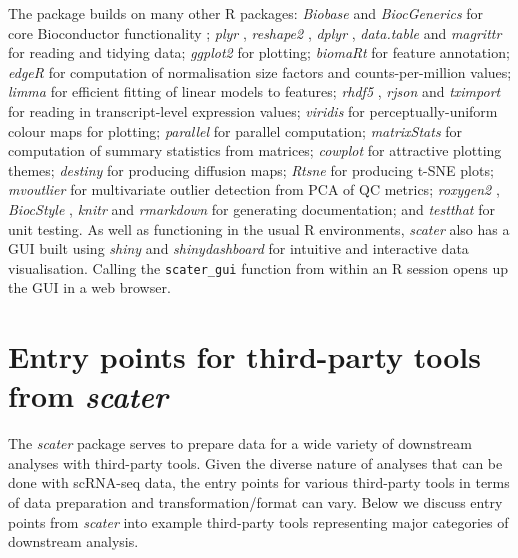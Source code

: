 \documentclass[10pt,letterpaper]{article}
\begin{document}
The package builds on many other R packages: \emph{Biobase} and \emph{BiocGenerics} for core Bioconductor functionality  \citep{Huber2015-en}; \emph{plyr} \citep{Wickham2015-kj}, \emph{reshape2} \citep{Wickham2012-ec}, \emph{dplyr} \citep{Wickham2015-la}, \emph{data.table} \citep{Dowle2015-zc} and \emph{magrittr} \citep{Bache2014-sa} for reading and
tidying data; \emph{ggplot2} \citep{Wickham2016-dc} for plotting; \emph{biomaRt} \citep{Durinck2005-yz} for feature annotation; \emph{edgeR} \citep{Robinson2010-ky} for computation of normalisation size factors and counts-per-million values; \emph{limma} \citep{Ritchie2015-so} for efficient fitting of linear models to features; \emph{rhdf5} \citep{Fischer2016-me}, \emph{rjson} \citep{Couture-Beil2014-kk} and \emph{tximport} \citep{Soneson2015-fw} for reading in transcript-level expression values;
\emph{viridis} \citep{Garnier2016-hk} for perceptually-uniform colour
maps for plotting; \emph{parallel} for parallel computation; \emph{matrixStats} \citep{Bengtsson2016-tn} for computation of summary statistics from matrices; \emph{cowplot} \citep{Wilke2016-hj} for attractive plotting themes; \emph{destiny} \citep{Angerer2015-sw} for producing diffusion maps; \emph{Rtsne} \citep{Krijthe2015-is} for producing t-SNE plots; \emph{mvoutlier}
\citep{Filzmoser2015-kx} for multivariate outlier detection from PCA of QC metrics; \emph{roxygen2} \citep{Wickham2015-pu}, \emph{BiocStyle} \citep{Huber2015-en}, \emph{knitr} \citep{Xie2013-bn} and \emph{rmarkdown} \citep{Allaire2016-dl} for generating documentation; and \emph{testthat} \citep{Wickham2011-cj} for unit testing. As well as functioning in the usual R environments, \emph{scater} also has a GUI built using
\emph{shiny} \citep{Chang2016-of} and \emph{shinydashboard} \citep{Chang2015-bn} for intuitive and interactive data visualisation. Calling the \verb|scater_gui| function from within an R session opens up the GUI in a web browser.


\section*{Entry points for third-party tools from \emph{scater}}

The \emph{scater} package serves to prepare data for a wide variety of downstream analyses with third-party tools. Given the diverse nature of analyses that can be done with scRNA-seq data, the entry points for various third-party tools in terms of data preparation and transformation/format can vary. Below we discuss entry points from \emph{scater} into example third-party tools representing major categories of downstream analysis.
\end{document}
